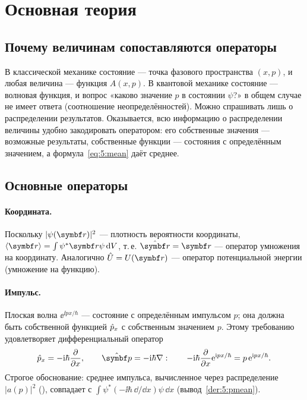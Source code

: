 \section{Основная теория}

\subsection{Почему величинам сопоставляются операторы}

В классической механике состояние — точка фазового пространства $(x,p)$, и любая величина —
функция $A(x,p)$. В квантовой механике состояние — волновая функция, и вопрос «каково значение
$p$ в состоянии $\psi$?» в общем случае не имеет ответа (соотношение неопределённостей). Можно
спрашивать лишь о распределении результатов. Оказывается, всю информацию о распределении
величины удобно закодировать оператором: его собственные значения — возможные результаты,
собственные функции — состояния с определённым значением, а формула~\eqref{eq:5:mean} даёт среднее.

\subsection{Основные операторы}

\paragraph{Координата.} Поскольку $|\psi(\vect r)|^2$ — плотность вероятности координаты,
$\avg{\vect r}=\int\psi^*\vect r\psi\,\dd V$, т.\,е. $\op{\vect r}=\vect r$ — оператор умножения на
координату. Аналогично $\op U=U(\vect r)$ — оператор потенциальной энергии (умножение на функцию).

\paragraph{Импульс.} Плоская волна $\ee^{\ii px/\hbar}$ — состояние с определённым импульсом $p$;
она должна быть собственной функцией $\hat{p}_x$ с собственным значением $p$. Этому требованию
удовлетворяет дифференциальный оператор
\begin{equation}\label{eq:5:p}
  \op p_x=-\ii\hbar\pdiff{}{x},\qquad \op{\vect p}=-\ii\hbar\nabla:\qquad
  -\ii\hbar\pdiff{}{x}\ee^{\ii px/\hbar}=p\,\ee^{\ii px/\hbar}.
\end{equation}
Строгое обоснование: среднее импульса, вычисленное через распределение $|a(p)|^2$ (),
совпадает с $\int\psi^*(-\ii\hbar\,\dd/\dd x)\psi\,\dd x$ (вывод~\ref{der:5:pmean}).


